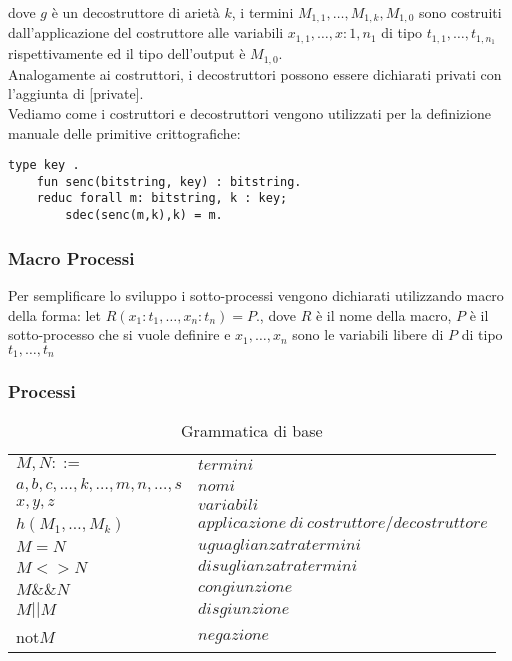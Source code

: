dove $g$ è un decostruttore di arietà $k$, i termini $M_{1,1} , \dots , M_{1,k}, M_{1,0}$ sono costruiti dall'applicazione del costruttore alle variabili $x_{1,1},\dots, x:{1,n_1}$ di tipo $t_{1,1},\dots,t_{1,n_1}$ rispettivamente ed il tipo dell'output è $M_{1,0}$.\\
Analogamente ai costruttori, i decostruttori possono essere dichiarati privati con l'aggiunta di [private].\\
Vediamo come i costruttori e decostruttori vengono utilizzati per la definizione manuale delle primitive crittografiche:
\begin{lstlisting}[language=app]
    type key .
    fun senc(bitstring, key) : bitstring.
    reduc forall m: bitstring, k : key; 
        sdec(senc(m,k),k) = m.
\end{lstlisting}

\subsubsection*{Macro Processi}
Per semplificare lo sviluppo i sotto-processi vengono dichiarati utilizzando macro della forma: let $R(x_1:t_1,\dots,x_n:t_n) = P$., dove $R$ è il nome della macro, $P$ è il sotto-processo che si vuole definire e $x_1,\dots,x_n$ sono le variabili libere di $P$ di tipo $t_1,\dots,t_n$

\subsubsection*{Processi}

\begin{table}[h!]
    \begin{tabular}{ll}
        $M,N ::=$ & $termini$\\
        \quad$a, b, c, \dots , k, \dots , m, n, \dots , s$ & $nomi$\\
        \quad$x, y, z$ & $variabili$\\
        \quad$h(M_1, \dots , M_k)$ & $applicazione \: di \: costruttore/decostruttore$\\
        \quad $M=N$ & $uguaglianza tra termini$\\
        \quad $M<>N$ & $disuglianza tra termini$\\
        \quad $M\&\&N$ & $congiunzione$\\
        \quad $M||M$ & $disgiunzione$\\
        \quad not$M$ & $negazione$\\    
    \end{tabular}
    \caption{Grammatica di base}
    \label{tab:gb}
\end{table}

